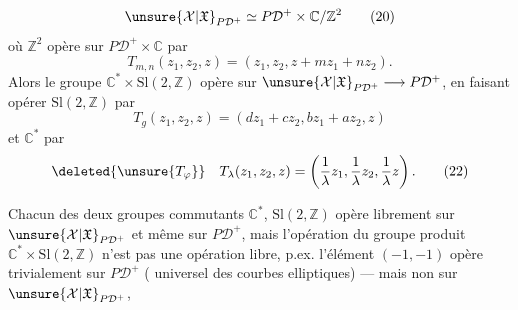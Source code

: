 \[
\unsure{\mathcal X|\mathfrak X}_{P\mathcal D^+}\simeq P\mathcal D^+\times\mathbb C/\mathbb Z^2
\tag{20}
\]
où $\mathbb Z^2$ opère sur $P\mathcal D^+\times\mathbb C$ par
\[
T_{m,n}(z_1,z_2,z)=(z_1,z_2,z+mz_1+nz_2).
\]
Alors le groupe $\mathbb C^*\times\mathrm{Sl}(2,\mathbb Z)$ opère sur
$\unsure{\mathcal X|\mathfrak X}_{P\mathcal D^+}\longrightarrow P\mathcal D^+$, en faisant opérer $\mathrm{Sl}(2,\mathbb Z)$
par
\[
T_g(z_1,z_2,z)=(dz_1+cz_2,bz_1+az_2,z)
\tag{21}
\]
et $\mathbb C^*$  par
\[
\deleted{\unsure{T_\varphi}}\quad
T_\lambda(z_1,z_2,z)=\left(\frac1\lambda z_1,\frac1\lambda z_2,\frac1\lambda z\right).
\tag{22}
\]

Chacun des deux groupes commutants
$\mathbb C^*$, $\mathrm{Sl}(2,\mathbb Z)$ opère librement sur $\unsure{\mathcal X|\mathfrak X}_{P\mathcal D^+}$ et
même sur $P\mathcal D^+$, mais l'opération du
groupe produit $\mathbb C^*\times\mathrm{Sl}(2,\mathbb Z)$  n'est pas
une opération libre, p.ex. l'élément
$(-1,-1)$ opère trivialement sur $P\mathcal D^+$
( universel des courbes elliptiques)
--- mais non sur $\unsure{\mathcal X|\mathfrak X}_{P\mathcal D^+}$,
